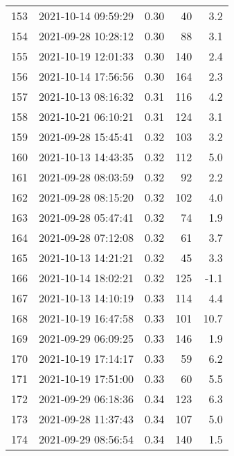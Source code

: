 \begin{tabular}{llrrr}
153 & 2021-10-14 09:59:29 &  0.30 &              40 &                    3.2 \\
154 & 2021-09-28 10:28:12 &  0.30 &              88 &                    3.1 \\
155 & 2021-10-19 12:01:33 &  0.30 &             140 &                    2.4 \\
156 & 2021-10-14 17:56:56 &  0.30 &             164 &                    2.3 \\
157 & 2021-10-13 08:16:32 &  0.31 &             116 &                    4.2 \\
158 & 2021-10-21 06:10:21 &  0.31 &             124 &                    3.1 \\
159 & 2021-09-28 15:45:41 &  0.32 &             103 &                    3.2 \\
160 & 2021-10-13 14:43:35 &  0.32 &             112 &                    5.0 \\
161 & 2021-09-28 08:03:59 &  0.32 &              92 &                    2.2 \\
162 & 2021-09-28 08:15:20 &  0.32 &             102 &                    4.0 \\
163 & 2021-09-28 05:47:41 &  0.32 &              74 &                    1.9 \\
164 & 2021-09-28 07:12:08 &  0.32 &              61 &                    3.7 \\
165 & 2021-10-13 14:21:21 &  0.32 &              45 &                    3.3 \\
166 & 2021-10-14 18:02:21 &  0.32 &             125 &                   -1.1 \\
167 & 2021-10-13 14:10:19 &  0.33 &             114 &                    4.4 \\
168 & 2021-10-19 16:47:58 &  0.33 &             101 &                   10.7 \\
169 & 2021-09-29 06:09:25 &  0.33 &             146 &                    1.9 \\
170 & 2021-10-19 17:14:17 &  0.33 &              59 &                    6.2 \\
171 & 2021-10-19 17:51:00 &  0.33 &              60 &                    5.5 \\
172 & 2021-09-29 06:18:36 &  0.34 &             123 &                    6.3 \\
173 & 2021-09-28 11:37:43 &  0.34 &             107 &                    5.0 \\
174 & 2021-09-29 08:56:54 &  0.34 &             140 &                    1.5 \\

\end{tabular}
